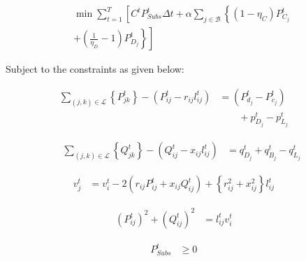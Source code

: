 \begin{equation}
    \begin{split}
        \min \sum_{t = 1}^{T} \left[ C^t P^t_{Subs} \Delta t+ \alpha \sum_{j \in \mathcal{B}} \left\{ (1-\eta_C)P^t_{C_j} \right. \right. \\
        \left. \left. + \left( \frac{1}{\eta_D} - 1 \right) P^t_{D_j} \right\} \right]
    \end{split}
    \label{eq:genCost_withSCD_enapp}
\end{equation}


Subject to the constraints  as given below:

\begin{align}
    {\sum_{(j, k) \in \mathcal{L}} \left\{P_{jk}^t\right\} 
    - \left(P_{ij}^t - r_{ij}l_{ij}^t\right)} &= {\left(P_{d_j}^t - P_{c_j}^t\right)} \nonumber \\[-0.8em]
    {} & {\qquad  + p^t_{D_j} - p^t_{L_j}}
    \label{eq:RealPowerBalanceNodej_enapp} &&
\end{align}

\vspace{-2.0em}

\begin{align}
    {\sum_{(j, k) \in \mathcal{L}} \left\{Q_{jk}^t\right\}  
    - \left(Q_{ij}^t - x_{ij}l_{ij}^t\right)} &= {q_{D_j}^t + q_{B_j}^t - q^t_{L_j}}
    \label{eq:ReactivePowerBalanceNodej_enapp}
\end{align}

\vspace{-1.5em}

\begin{align}
    {v_j^t} &= {v_{i}^t - 2(r_{ij}P_{ij}^t + x_{ij}Q_{ij}^t) + \left\{r_{ij}^2 + x_{ij}^2\right\}l_{ij}^t}  
    \label{eq:KVL-branch-ij_enapp} &&
\end{align}

\vspace{-1.5em}

\begin{align}
    {(P_{ij}^{t})^2 + (Q_{ij}^{t})^2} &= {l_{ij}^t v_i^t} 
    \label{eq:ApparentPowerEquationBFM_enapp} &&
\end{align}

\vspace{-2.0em}

\begin{align}
    {P^t_{Subs}} &\geq {0} \label{eq:substationRealPowerLimits_enapp} &&
\end{align}

